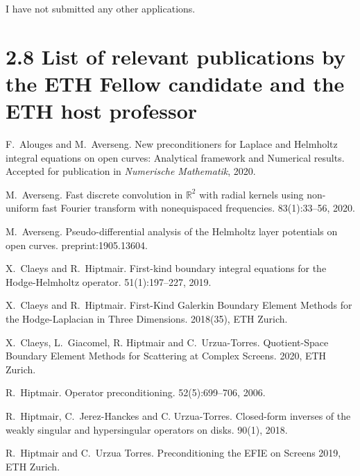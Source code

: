 \documentclass[]{report}
\begin{document}
I have not submitted any other applications.

\section*{2.8 List of relevant publications by the ETH Fellow candidate and the ETH host professor}

\begin{thebibliography}{0}
	F.~Alouges and M.~Averseng.
	\newblock New preconditioners for Laplace and Helmholtz integral equations on open curves: Analytical framework and Numerical results. 
	\newblock Accepted for publication in {\em Numerische Mathematik}, 2020.
	
	M.~Averseng.
	\newblock Fast discrete convolution in $\mathbb {R}^{2} $ with radial kernels using non-uniform fast Fourier transform with nonequispaced frequencies. 
	 83(1):33--56, 2020.
	
	M.~Averseng. 
	\newblock Pseudo-differential analysis of the Helmholtz layer potentials on open curves. 
	 preprint:1905.13604.
	
	X.~Claeys and R.~Hiptmair.
	\newblock First-kind boundary integral equations for the {H}odge-{H}elmholtz operator.
	 51(1):197--227, 2019.
	
	X.~Claeys and R.~Hiptmair.
	\newblock First-Kind Galerkin Boundary Element Methods for the {H}odge-{L}aplacian in Three Dimensions.
	 2018(35), ETH Zurich.
	
	X.~Claeys, L.~Giacomel, R. Hiptmair and C.~Urzua-Torres.
	\newblock Quotient-Space Boundary Element Methods for Scattering at Complex Screens.
	 2020, ETH Zurich.
	
	
	R.~Hiptmair.
	\newblock Operator preconditioning.
	 52(5):699--706, 2006.
	
	
	R.~Hiptmair, C.~Jerez-Hanckes and C. Urzua-Torres.
	\newblock Closed-form inverses of the weakly singular and hypersingular operators on disks.
	 90(1), 2018.
	
	R.~Hiptmair and C.~Urzua Torres.
	Preconditioning the EFIE on Screens
	 2019, ETH Zurich.
	


\end{thebibliography}
\end{document}
